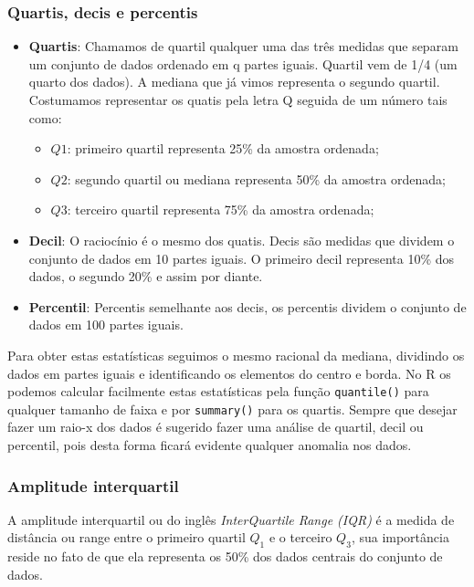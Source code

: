 \documentclass[12pt,]{style/krantz}
\providecommand{\tightlist}{%
  \setlength{\itemsep}{0pt}\setlength{\parskip}{0pt}}
\theoremstyle{definition}
\theoremstyle{definition}
\theoremstyle{definition}
\theoremstyle{remark}
\begin{document}
\subsubsection{Quartis, decis e
percentis}\label{quartis-decis-e-percentis}

\begin{itemize}
\item
  \textbf{Quartis}: Chamamos de quartil qualquer uma das três medidas
  que separam um conjunto de dados ordenado em q partes iguais. Quartil
  vem de 1/4 (um quarto dos dados). A mediana que já vimos representa o
  segundo quartil. Costumamos representar os quatis pela letra Q seguida
  de um número tais como:

  \begin{itemize}
  \tightlist
  \item
    \(Q1\): primeiro quartil representa 25\% da amostra ordenada;
  \item
    \(Q2\): segundo quartil ou mediana representa 50\% da amostra
    ordenada;
  \item
    \(Q3\): terceiro quartil representa 75\% da amostra ordenada;
  \end{itemize}
\item
  \textbf{Decil}: O raciocínio é o mesmo dos quatis. Decis são medidas
  que dividem o conjunto de dados em 10 partes iguais. O primeiro decil
  representa 10\% dos dados, o segundo 20\% e assim por diante.
\item
  \textbf{Percentil}: Percentis semelhante aos decis, os percentis
  dividem o conjunto de dados em 100 partes iguais.
\end{itemize}

Para obter estas estatísticas seguimos o mesmo racional da mediana,
dividindo os dados em partes iguais e identificando os elementos do
centro e borda. No R os podemos calcular facilmente estas estatísticas
pela função \texttt{quantile()} para qualquer tamanho de faixa e por
\texttt{summary()} para os quartis. Sempre que desejar fazer um raio-x
dos dados é sugerido fazer uma análise de quartil, decil ou percentil,
pois desta forma ficará evidente qualquer anomalia nos dados.

\subsubsection{Amplitude interquartil}\label{amplitude-interquartil}

A amplitude interquartil ou do inglês \emph{InterQuartile Range (IQR)} é
a medida de distância ou range entre o primeiro quartil \(Q_1\) e o
terceiro \(Q_3\), sua importância reside no fato de que ela representa
os 50\% dos dados centrais do conjunto de dados.
\end{document}
